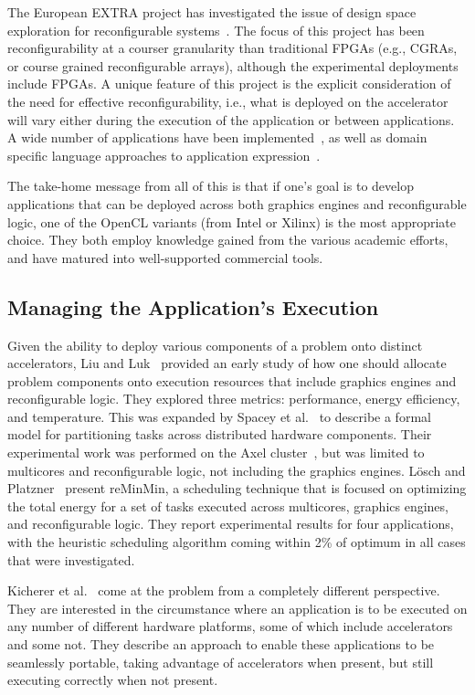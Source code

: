 The European EXTRA project has investigated the issue of design space
exploration for reconfigurable systems~\cite{extra,extra2}. The focus of this
project has been reconfigurability at a courser granularity than traditional
FPGAs (e.g., CGRAs, or course grained reconfigurable arrays), although
the experimental deployments include FPGAs.
A unique feature of this project is the explicit consideration of the
need for effective reconfigurability, i.e., what is deployed on the
accelerator will vary either during the execution of the application or
between applications.
A wide number of applications have been
implemented~\cite{cns+15,zfl+16,akl+17}, as
well as domain specific language approaches to application
expression~\cite{lll16,itl17}.

The take-home message from all of this is that if one's goal is to
develop applications that can be deployed across both graphics engines
and reconfigurable logic, one of the OpenCL variants (from Intel or Xilinx)
is the most appropriate choice.  They both employ knowledge gained from
the various academic efforts, and have matured into well-supported
commercial tools.

\subsection{Managing the Application's Execution}

Given the ability to deploy various components of a problem onto distinct
accelerators, Liu and Luk~\cite{ll11,ll12} provided an early study of how one
should allocate problem components onto execution resources that include
graphics engines and reconfigurable logic.  They explored
three metrics: performance, energy efficiency, and temperature.
This was expanded by Spacey et al.~\cite{slkk13} to describe a formal
model for partitioning tasks across distributed hardware components.
Their experimental work was performed on the Axel cluster~\cite{tl10},
but was limited to multicores and reconfigurable logic, not including
the graphics engines.
L\"{o}sch and Platzner~\cite{lp17} present reMinMin, a scheduling technique
that is focused on optimizing the total energy for a set of tasks executed
across multicores, graphics engines, and reconfigurable logic.  They
report experimental results for four applications, with the heuristic
scheduling algorithm coming within 2\% of optimum in all cases that
were investigated.

Kicherer et al.~\cite{knbk12} come at the problem from a completely
different perspective.  They are interested in the circumstance where an
application is to be executed on any number of different hardware platforms,
some of which include accelerators and some not.  They describe an approach
to enable these applications to be seamlessly portable, taking advantage of
accelerators when present, but still executing correctly when not present.


